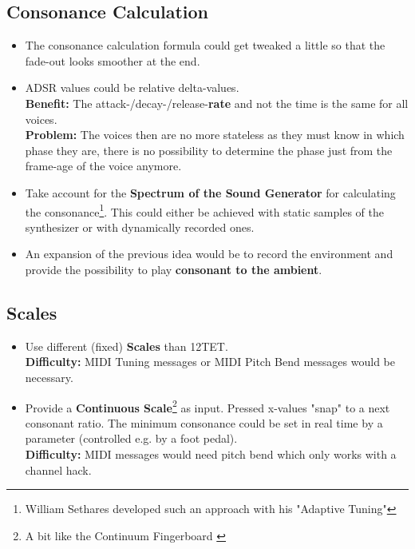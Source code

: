 \documentclass[12pt,a4paper,titlepage,oneside]{report}
\begin{document}
\subsection{Consonance Calculation}

\begin{itemize}

	\item The consonance calculation formula could get tweaked a little so that the fade-out looks smoother at the end.

	\item ADSR values could be relative delta-values. \\
	\textbf{Benefit:} The attack-/decay-/release-\textbf{rate} and not the time is the same for all voices. \\
	\textbf{Problem:} The voices then are no more stateless as they must know in which phase they are, there is no possibility to determine the phase just from the frame-age of the voice anymore.

	\item Take account for the \textbf{Spectrum of the Sound Generator} for calculating the consonance\footnote{William Sethares developed such an approach with his "Adaptive Tuning"}. This could either be achieved with static samples of the synthesizer or with dynamically recorded ones.

	\item An expansion of the previous idea would be to record the environment and provide the possibility to play \textbf{consonant to the ambient}.

\end{itemize}


\subsection{Scales}

\begin{itemize}

	\item Use different (fixed) \textbf{Scales} than 12TET. \\
	\textbf{Difficulty:} MIDI Tuning messages or MIDI Pitch Bend messages would be necessary.

	\item Provide a \textbf{Continuous Scale}\footnote{A bit like the Continuum Fingerboard \cite{bib:continuum}} as input. Pressed x-values "snap" to a next consonant ratio. The minimum consonance could be set in real time by a parameter (controlled e.g. by a foot pedal). \\
	\textbf{Difficulty:} MIDI messages would need pitch bend which only works with a channel hack.

\end{itemize}
\end{document}
